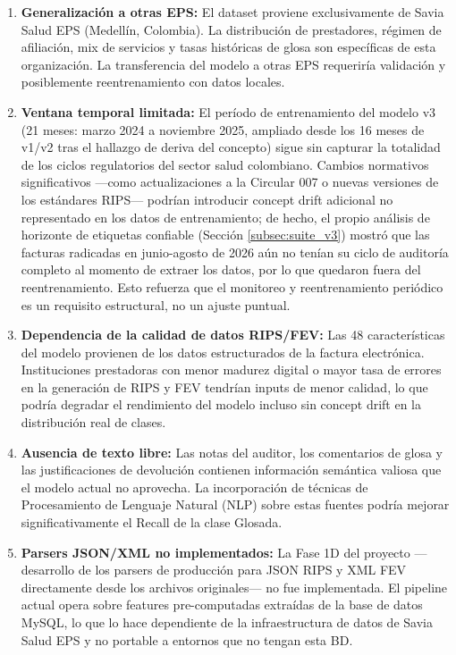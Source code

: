 \documentclass[12pt,letterpaper]{report}
\begin{document}
\begin{enumerate}
    \item \textbf{Generalización a otras EPS:} El dataset proviene exclusivamente de Savia Salud EPS (Medellín, Colombia). La distribución de prestadores, régimen de afiliación, mix de servicios y tasas históricas de glosa son específicas de esta organización. La transferencia del modelo a otras EPS requeriría validación y posiblemente reentrenamiento con datos locales.

    \item \textbf{Ventana temporal limitada:} El período de entrenamiento del modelo v3 (21 meses: marzo 2024 a noviembre 2025, ampliado desde los 16 meses de v1/v2 tras el hallazgo de deriva del concepto) sigue sin capturar la totalidad de los ciclos regulatorios del sector salud colombiano. Cambios normativos significativos —como actualizaciones a la Circular 007 o nuevas versiones de los estándares RIPS— podrían introducir concept drift adicional no representado en los datos de entrenamiento; de hecho, el propio análisis de horizonte de etiquetas confiable (Sección \ref{subsec:suite_v3}) mostró que las facturas radicadas en junio-agosto de 2026 aún no tenían su ciclo de auditoría completo al momento de extraer los datos, por lo que quedaron fuera del reentrenamiento. Esto refuerza que el monitoreo y reentrenamiento periódico es un requisito estructural, no un ajuste puntual.

    \item \textbf{Dependencia de la calidad de datos RIPS/FEV:} Las 48 características del modelo provienen de los datos estructurados de la factura electrónica. Instituciones prestadoras con menor madurez digital o mayor tasa de errores en la generación de RIPS y FEV tendrían inputs de menor calidad, lo que podría degradar el rendimiento del modelo incluso sin concept drift en la distribución real de clases.

    \item \textbf{Ausencia de texto libre:} Las notas del auditor, los comentarios de glosa y las justificaciones de devolución contienen información semántica valiosa que el modelo actual no aprovecha. La incorporación de técnicas de Procesamiento de Lenguaje Natural (NLP) sobre estas fuentes podría mejorar significativamente el Recall de la clase Glosada.

    \item \textbf{Parsers JSON/XML no implementados:} La Fase 1D del proyecto —desarrollo de los parsers de producción para JSON RIPS y XML FEV directamente desde los archivos originales— no fue implementada. El pipeline actual opera sobre features pre-computadas extraídas de la base de datos MySQL, lo que lo hace dependiente de la infraestructura de datos de Savia Salud EPS y no portable a entornos que no tengan esta BD.


\end{enumerate}
\end{document}
